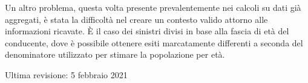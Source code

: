 \documentclass[a4paper]{article}
\begin{document}
Un altro problema, questa volta presente prevalentemente nei calcoli su dati già aggregati, 
è stata la difficoltà nel creare un contesto valido attorno alle informazioni ricavate. 
\`E il caso dei sinistri divisi in base alla fascia di età del conducente, dove è possibile 
ottenere esiti marcatamente differenti a seconda del denominatore utilizzato per 
stimare la popolazione per età.

\raggedleft\vfill\scriptsize Ultima revisione: 5 febbraio 2021\par
\end{document}
